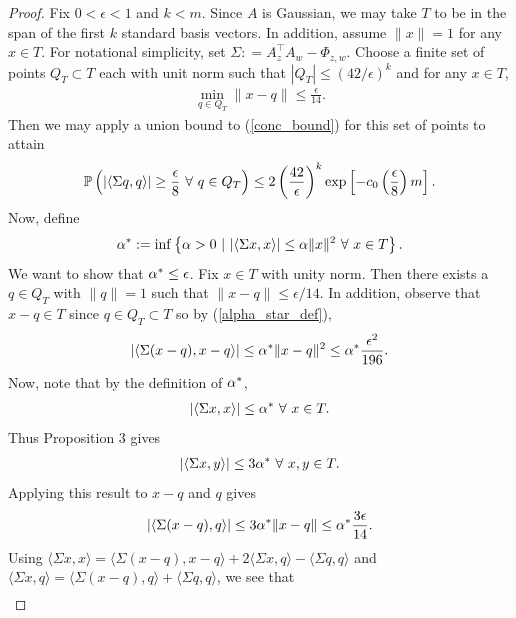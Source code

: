 \documentclass{article}
\begin{document}
\begin{proof}

Fix $0 < \epsilon < 1$ and $k < m$. Since $A$ is Gaussian, we may take $T$ to be in the span of the first $k$ standard basis vectors. In addition, assume $\|x\| = 1$ for any $x \in T$. For notational simplicity, set $\Sigma : = A_z^\top A_w - \Phi_{z,w}$.  Choose a finite set of points $Q_T \subset T$ each with unit norm such that $|Q_T| \leq (42/\epsilon)^k$ and for any $x \in T$, \begin{align}
\min_{q \in Q_T}\|x - q\| \leq \frac{\epsilon}{14}. \label{min_bound}
\end{align} Then we may apply a union bound to (\ref{conc_bound}) for this set of points to attain \begin{align}
\Pro\left(|\langle \Sigma q,q \rangle| \geq \frac{\epsilon}{8}\ \forall\ q \in Q_T\right) \leq 2 \left(\frac{42}{\epsilon}\right)^k\exp\left[-c_0\left(\frac{\epsilon}{8}\right)m\right].
\end{align} Now, define \begin{align}
\alpha^* : = \inf\left\{\alpha > 0 \ |\ |\langle \Sigma x,x\rangle| \leq \alpha\|x\|^2\ \forall\ x \in T\right\}. \label{alpha_star_def}
\end{align} We want to show that $\alpha^* \leq \epsilon$. Fix $x \in T$ with unity norm. Then there exists a $q \in Q_T$ with $\|q\| = 1$ such that $\|x - q \| \leq \epsilon/14.$ In addition, observe that $x - q \in T$ since $q \in Q_T \subset T$ so by (\ref{alpha_star_def}), \begin{align}
|\langle \Sigma(x-q),x-q\rangle| \leq \alpha^*\|x-q\|^2 \leq \alpha^*\frac{\epsilon^2}{196}.
\end{align} Now, note that by the definition of $\alpha^*$, \begin{align*}
|\langle \Sigma x, x \rangle| \leq \alpha^*\ \forall\ x \in T.
\end{align*} Thus Proposition 3 gives \begin{align*}
|\langle \Sigma x, y \rangle| \leq 3\alpha^*\ \forall\ x,y \in T.
\end{align*} Applying this result to $x-q$ and $q$ gives \begin{align*}
|\langle \Sigma (x-q), q \rangle| \leq 3\alpha^*\|x- q\| \leq \alpha^*\frac{3\epsilon}{14}.
\end{align*} Using $\langle \Sigma x,x \rangle = \langle \Sigma(x-q),x-q \rangle + 2\langle \Sigma x,q \rangle - \langle \Sigma q, q \rangle$ and $\langle \Sigma x,q \rangle = \langle \Sigma (x-q),q\rangle + \langle \Sigma q,q \rangle$, we see that \begin{align*}

\end{align*}
\end{proof}
\end{document}
